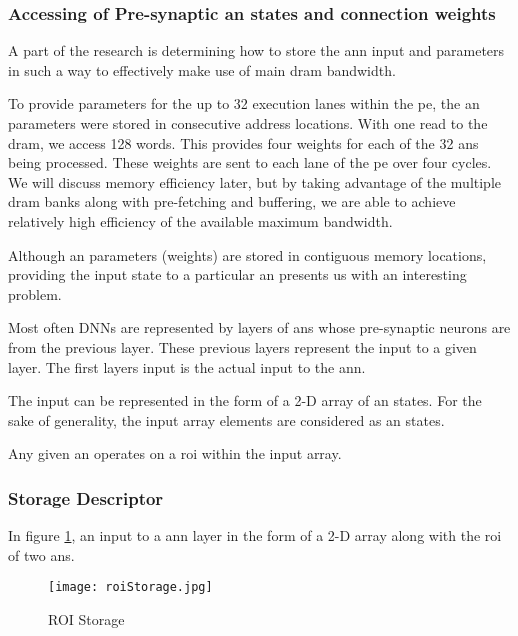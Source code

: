 \subsubsection{Accessing of Pre-synaptic \ac{an} states and connection weights}
\label{sec:AccessingANStates}

A part of the research is determining how to store the \ac{ann} input and parameters in such a way to effectively make use of main \ac{dram} bandwidth. 

To provide parameters for the up to 32 execution lanes within the \ac{pe}, the \ac{an} parameters were stored in consecutive address locations. 
With one read to the \ac{dram}, we access 128 words. This provides four weights for each of the 32 \acp{an} being processed. 
These weights are sent to each lane of the \ac{pe} over four cycles. 
We will discuss memory efficiency later, but by taking advantage of the multiple \ac{dram} banks along with pre-fetching and buffering, we are able to achieve relatively high efficiency of the available maximum bandwidth.

Although \ac{an} parameters (weights) are stored in contiguous memory locations, providing the input state to a particular \ac{an} presents us with an interesting problem.

Most often DNNs are represented by layers of \acp{an} whose pre-synaptic neurons are from the previous layer. These previous layers represent the input to a given layer. The first layers input is the actual input to the \ac{ann}.

The input can be represented in the form of a 2-D array of \ac{an} states. For the sake of generality, the input array elements are considered as \ac{an} states.

Any given \ac{an} operates on a \ac{roi} within the input array.

\subsubsection{Storage Descriptor}
\label{sec:Storage Descriptor}

In figure \ref{fig:roiStorage}, an input to a \ac{ann} layer in the form of a 2-D array along with the \ac{roi} of two \acp{an}.

\begin{figure}[!t]
\centering
\captionsetup{justification=centering}
\captionsetup{width=.9\linewidth}
\centerline{
\mbox{\texttt{[image: roiStorage.jpg]}}
}
\caption{ROI Storage}
\label{fig:roiStorage}
\end{figure}


